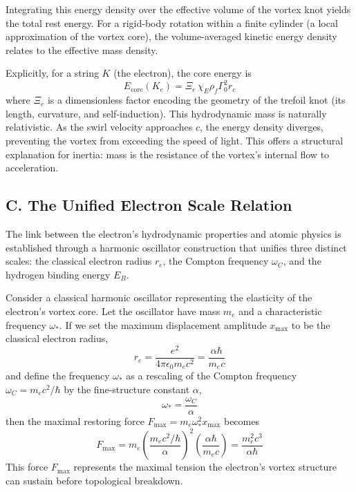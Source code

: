 \documentclass[11pt]{article}
\begin{document}
Integrating this energy density over the effective volume of the vortex knot yields the total rest energy. For a rigid-body rotation within a finite cylinder (a local approximation of the vortex core), the volume-averaged kinetic energy density relates to the effective mass density.

Explicitly, for a string $K$ (the electron), the core energy is
\begin{equation}
E_{\text{core}}(K_e) = \Xi_e \, \chi_E \rho_f \Gamma_0^2 r_c
\end{equation}
where $\Xi_e$ is a dimensionless factor encoding the geometry of the trefoil knot (its length, curvature, and self-induction). This hydrodynamic mass is naturally relativistic. As the swirl velocity approaches $c$, the energy density diverges, preventing the vortex from exceeding the speed of light. This offers a structural explanation for inertia: mass is the resistance of the vortex's internal flow to acceleration.

\subsection*{C. The Unified Electron Scale Relation}
The link between the electron's hydrodynamic properties and atomic physics is established through a harmonic oscillator construction that unifies three distinct scales: the classical electron radius $r_e$, the Compton frequency $\omega_C$, and the hydrogen binding energy $E_B$.

Consider a classical harmonic oscillator representing the elasticity of the electron's vortex core. Let the oscillator have mass $m_e$ and a characteristic frequency $\omega_*$. If we set the maximum displacement amplitude $x_{\max}$ to be the classical electron radius,
\begin{equation}
r_e = \frac{e^2}{4\pi \epsilon_0 m_e c^2} = \frac{\alpha \hbar}{m_e c}
\end{equation}
and define the frequency $\omega_*$ as a rescaling of the Compton frequency $\omega_C = m_e c^2 / \hbar$ by the fine-structure constant $\alpha$,
\begin{equation}
\omega_* = \frac{\omega_C}{\alpha}
\end{equation}
then the maximal restoring force $F_{\max} = m_e \omega_*^2 x_{\max}$ becomes
\begin{equation}
F_{\max} = m_e \left( \frac{m_e c^2 / \hbar}{\alpha} \right)^2 \left( \frac{\alpha \hbar}{m_e c} \right) = \frac{m_e^2 c^3}{\alpha \hbar}
\end{equation}
This force $F_{\max}$ represents the maximal tension the electron's vortex structure can sustain before topological breakdown.
\end{document}
